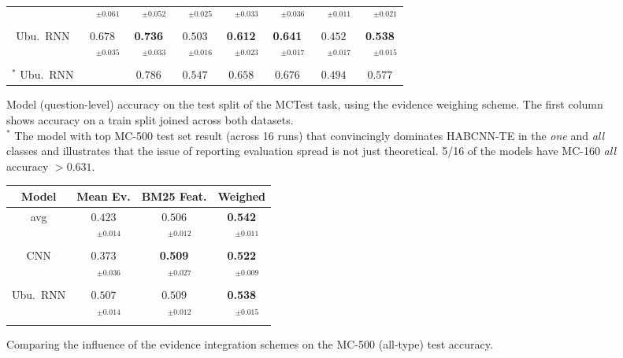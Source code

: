 \documentclass[11pt]{article}
\begin{document}
\begin{figure*}[t]
\begin{tabular}{|c|c|ccc|ccc|}
 & $\quad^{\pm0.061}$ & $\quad^{\pm0.052}$ & $\quad^{\pm0.025}$ & $\quad^{\pm0.033}$ & $\quad^{\pm0.036}$ & $\quad^{\pm0.011}$ & $\quad^{\pm0.021}$\\
Ubu.\ RNN & $0.678$ & \textbf{0.736} & $0.503$ & \textbf{0.612} & \textbf{0.641} & $0.452$ & \textbf{0.538}\\
 & $\quad^{\pm0.035}$ & $\quad^{\pm0.033}$ & $\quad^{\pm0.016}$ & $\quad^{\pm0.023}$ & $\quad^{\pm0.017}$ & $\quad^{\pm0.017}$ & $\quad^{\pm0.015}$\\
\hline
$^*$ Ubu.\ RNN & & $0.786$ & $0.547$ & $0.658$ & $0.676$ & $0.494$ & $0.577$ \\
\hline
\end{tabular}
\setlength{\tabcolsep}{6pt}
\vspace*{-0.2cm}
\caption{\footnotesize%
	Model (question-level) accuracy on the test split of the MCTest task, using the evidence weighing scheme.
	The first column shows accuracy on a train split joined across both datasets.\\
	$^*$ The model with top MC-500 test set result (across 16 runs)
	that convincingly dominates HABCNN-TE in the \textit{one} and \textit{all} classes and illustrates that the issue of
	reporting evaluation spread is not just theoretical. 5/16 of the models have MC-160 \textit{all} accuracy $>0.631$.
}
\label{tab:mctest}
\end{figure*}

\begin{figure}[t]
\centering
\setlength{\tabcolsep}{3pt}
\begin{tabular}{|c|c|c|c|}
\hline
Model              & Mean Ev. & BM25 Feat. & Weighed \\
\hline
avg & $0.423$ & $0.506$ & \textbf{0.542}\\
 & $\quad^{\pm0.014}$ & $\quad^{\pm0.012}$ & $\quad^{\pm0.011}$\\
\hline
CNN & $0.373$ & \textbf{0.509} & \textbf{0.522}\\
 & $\quad^{\pm0.036}$ & $\quad^{\pm0.027}$ & $\quad^{\pm0.009}$\\
Ubu.\ RNN & $0.507$ & $0.509$ & \textbf{0.538}\\
 & $\quad^{\pm0.014}$ & $\quad^{\pm0.012}$ & $\quad^{\pm0.015}$\\
\hline
\end{tabular}
\setlength{\tabcolsep}{6pt}
\vspace*{-0.2cm}
\caption{\footnotesize%
	Comparing the influence of the evidence integration schemes on the MC-500 (all-type) test accuracy.
}
\label{tab:mctestev}
\end{figure}
\end{document}
